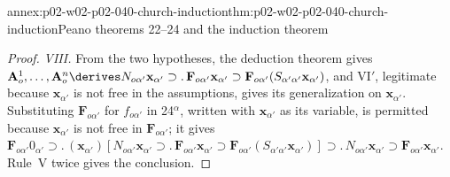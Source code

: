 \begin{annexitem}{annex:p02-w02-p02-040-church-induction}{thm:p02-w02-p02-040-church-induction}{Peano theorems 22--24 and the induction theorem}
\begin{proof}
\emph{VIII.}  From the two hypotheses, the deduction theorem gives
\(\mathbf A^1_o,\ldots,\mathbf A^n_o\derives N_{o\alpha'}\mathbf x_{\alpha'}\supset.\,
\mathbf F_{o\alpha'}\mathbf x_{\alpha'}\supset\mathbf F_{o\alpha'}(S_{\alpha'\alpha'}\mathbf x_{\alpha'})\),
and VI\('\), legitimate because \(\mathbf x_{\alpha'}\) is not free in the
assumptions, gives its generalization on \(\mathbf x_{\alpha'}\).
Substituting \(\mathbf F_{o\alpha'}\) for \(f_{o\alpha'}\) in 24\(^\alpha\),
written with \(\mathbf x_{\alpha'}\) as its variable, is permitted because
\(\mathbf x_{\alpha'}\) is not free in \(\mathbf F_{o\alpha'}\); it gives
\(\mathbf F_{o\alpha'}0_{\alpha'}\supset.\,(\mathbf x_{\alpha'})[N_{o\alpha'}\mathbf x_{\alpha'}\supset.\,
\mathbf F_{o\alpha'}\mathbf x_{\alpha'}\supset\mathbf F_{o\alpha'}(S_{\alpha'\alpha'}\mathbf x_{\alpha'})]
\supset.\,N_{o\alpha'}\mathbf x_{\alpha'}\supset\mathbf F_{o\alpha'}\mathbf x_{\alpha'}\).
Rule~V twice gives the conclusion.
\end{proof}
\end{annexitem}


